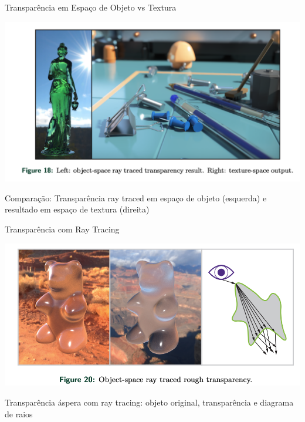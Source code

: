 \documentclass[aspectratio=169,xcolor=table]{beamer}
\begin{document}
\begin{frame}{Transparência em Espaço de Objeto vs Textura}
    \begin{center}
        \includegraphics[height=0.7\textheight]{object-and-texture-space-transparency}
    \end{center}
    \begin{center}
        \small{Comparação: Transparência ray traced em espaço de objeto (esquerda) e resultado em espaço de textura (direita)}
    \end{center}
\end{frame}

\begin{frame}{Transparência com Ray Tracing}
    \begin{center}
        \includegraphics[height=0.7\textheight]{object-space-ray-traced-transparency}
    \end{center}
    \begin{center}
        \small{Transparência áspera com ray tracing: objeto original, transparência e diagrama de raios}
    \end{center}
\end{frame}
\end{document}
